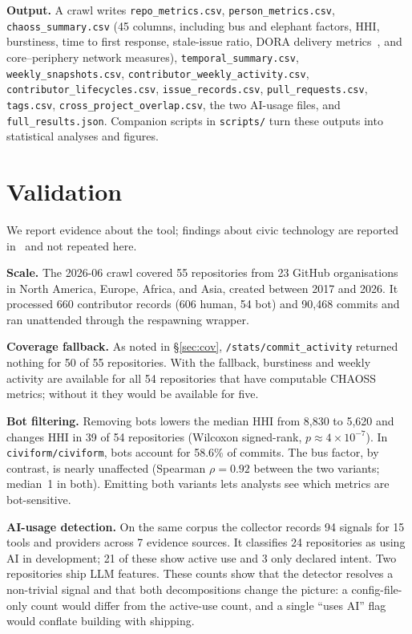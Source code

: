 \documentclass[10pt,conference]{IEEEtran}
\begin{document}
\textbf{Output.} A crawl writes \texttt{repo\_metrics.csv}, \texttt{person\_metrics.csv}, \texttt{chaoss\_summary.csv} (45 columns, including bus and elephant factors, HHI, burstiness, time to first response, stale-issue ratio, DORA delivery metrics~\cite{dora}, and core--periphery network measures), \texttt{temporal\_summary.csv}, \texttt{weekly\_snapshots.csv}, \texttt{contributor\_weekly\_activity.csv}, \texttt{contributor\_lifecycles.csv}, \texttt{issue\_records.csv}, \texttt{pull\_requests.csv}, \texttt{tags.csv}, \texttt{cross\_project\_overlap.csv}, the two AI-usage files, and \texttt{full\_results.json}. Companion scripts in \texttt{scripts/} turn these outputs into statistical analyses and figures.

\section{Validation}

We report evidence about the tool; findings about civic technology are reported in~\cite{goodit26} and not repeated here.

\textbf{Scale.} The 2026-06 crawl covered 55 repositories from 23 GitHub organisations in North America, Europe, Africa, and Asia, created between 2017 and 2026. It processed 660 contributor records (606 human, 54 bot) and 90{,}468 commits and ran unattended through the respawning wrapper.

\textbf{Coverage fallback.} As noted in \S\ref{sec:cov}, \texttt{/stats/commit\_activity} returned nothing for 50 of 55 repositories. With the fallback, burstiness and weekly activity are available for all 54 repositories that have computable CHAOSS metrics; without it they would be available for five.

\textbf{Bot filtering.} Removing bots lowers the median HHI from 8{,}830 to 5{,}620 and changes HHI in 39 of 54 repositories (Wilcoxon signed-rank, $p \approx 4\times10^{-7}$). In \texttt{civiform/civiform}, bots account for 58.6\% of commits. The bus factor, by contrast, is nearly unaffected (Spearman $\rho=0.92$ between the two variants; median~1 in both). Emitting both variants lets analysts see which metrics are bot-sensitive.

\textbf{AI-usage detection.} On the same corpus the collector records 94 signals for 15 tools and providers across 7 evidence sources. It classifies 24 repositories as using AI in development; 21 of these show active use and 3 only declared intent. Two repositories ship LLM features. These counts show that the detector resolves a non-trivial signal and that both decompositions change the picture: a config-file-only count would differ from the active-use count, and a single ``uses AI'' flag would conflate building with shipping.
\end{document}
